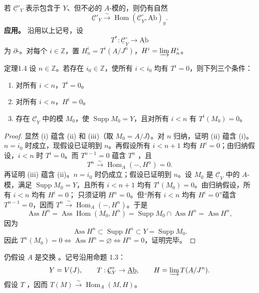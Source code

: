 若 $\underline{\mathcal C}'_Y$ 表示包含于 $Y$、但不必的 $A$-模的，则仍有自然
\[\underline{\mathcal C}'_Y\xrightarrow{\sim}\operatorname{Hom}(\underline{\mathcal C}_Y^{\circ},\underline{\mathrm{Ab}})_g.\]
\textbf{应用。} 沿用以上记号，设
\[T^*:\underline{\mathcal C}_Y^{\circ}\longrightarrow\underline{\mathrm{Ab}}\]
为 $\partial$-。对每个 $i\in\mathbb Z$，置 $H_n^i=T^i(A/J^n)$，$H^i=\varinjlim H_n^i$。
\begin{SGAresult}{定理}{1.4}
设 $n\in\mathbb Z$。若存在 $i_0\in\mathbb Z$，使所有 $i<i_0$ 均有 $T^i=0$，则下列三个条件：
\begin{enumerate}
\item[(i)] 对所有 $i<n$，$T^i=0$。
\item[(ii)] 对所有 $i<n$，$H^i=0$。
\item[(iii)] 存在 $\underline{\mathcal C}_Y$ 中的模 $M_0$，使 $\operatorname{Supp}M_0=Y$，且对所有 $i<n$ 有 $T^i(M_0)=0$。
\end{enumerate}
\end{SGAresult}
\begin{proof}
显然 (i) 蕴含 (ii) 和 (iii)（取 $M_0=A/J$）。对 $n$ 归纳，证明 (ii) 蕴含 (i)。$n=i_0$ 时成立，现假设已证明到 $n$。再假设所有 $i<n+1$ 均有 $H^i=0$；由归纳假设，$i<n$ 时 $T^i=0$。而 $T^{n-1}=0$ 蕴含 $T^n$ ，且
\[T^n\xrightarrow{\sim}\operatorname{Hom}_A(-,H^n)=0.\]
再证明 (iii) 蕴含 (ii)。$n=i_0$ 时仍成立；假设已证明到 $n$。设 $M_0$ 是 $\underline{\mathcal C}_Y$ 中的 $A$-模，满足 $\operatorname{Supp}M_0=Y$，且所有 $i<n+1$ 均有 $T^i(M_0)=0$。由归纳假设，所有 $i<n$ 均有 $H^i=0$；
只须证明 $H^n=0$。但“所有 $i<n$ 均有 $H^i=0$”蕴含 $T^{n-1}=0$，因而 $T^n\xrightarrow{\sim}\operatorname{Hom}_A(-,H^n)$。于是
\[\operatorname{Ass}H^n=\operatorname{Ass}\operatorname{Hom}(M_0,H^n)=\operatorname{Supp}M_0\cap\operatorname{Ass}H^n=\operatorname{Ass}H^n,\]
因为
\[\operatorname{Ass}H^n\subset\operatorname{Supp}H^n\subset Y=\operatorname{Supp}M_0.\]
因此 $T^n(M_0)=0\Longleftrightarrow\operatorname{Ass}H^n=\varnothing\Longleftrightarrow H^n=0$，证明完毕。
\end{proof}
仍假设 $A$ 是交换 。记号沿用命题 1.3：
\[Y=V(J),\qquad T:\underline{\mathcal C}_Y^{\circ}\to\underline{\mathrm{Ab}},\qquad H=\varinjlim T(A/J^n).\]
假设 $T$ ，因而 $T(M)\xrightarrow{\sim}\operatorname{Hom}_A(M,H)$。
